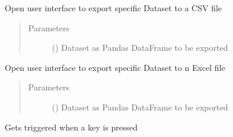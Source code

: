 \documentclass[letterpaper,10pt,english]{sphinxmanual}
\begin{document}
\begin{fulllineitems}
\begin{fulllineitems}
\begin{quote}
\begin{description}
\end{description}\end{quote}

\end{fulllineitems}


\begin{fulllineitems}
\label{\detokenize{api:beamon.ui.main.Main.export_csv}}
Open user interface to export specific Dataset to a CSV file
\begin{quote}\begin{description}
\item[{Parameters}] \leavevmode
{} () \textendash{} Dataset as Pandas DataFrame to be exported

\end{description}\end{quote}

\end{fulllineitems}


\begin{fulllineitems}
\label{\detokenize{api:beamon.ui.main.Main.export_excel}}
Open user interface to export specific Dataset to n Excel file
\begin{quote}\begin{description}
\item[{Parameters}] \leavevmode
{} () \textendash{} Dataset as Pandas DataFrame to be exported

\end{description}\end{quote}

\end{fulllineitems}


\begin{fulllineitems}
\label{\detokenize{api:beamon.ui.main.Main.keyPressEvent}}
Gets triggered when a key is pressed


\end{fulllineitems}
\end{fulllineitems}
\end{document}
